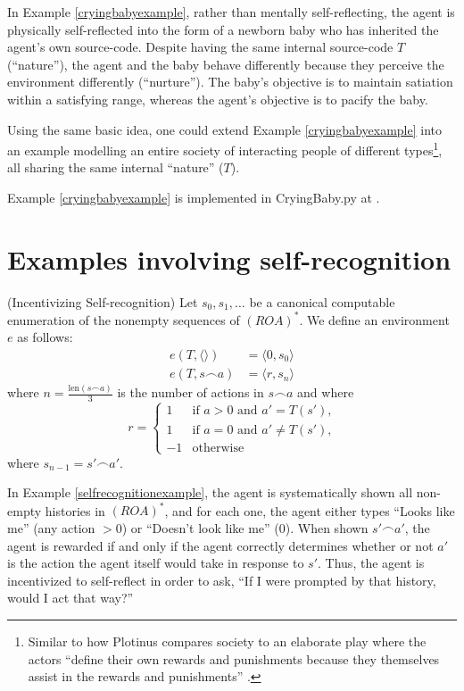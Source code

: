 \documentclass[runningheads]{llncs}
\begin{document}
In Example \ref{cryingbabyexample}, rather than mentally self-reflecting,
the agent is physically self-reflected into the form of a newborn baby
who has inherited the agent's own source-code. Despite having the same
internal source-code $T$ (``nature''), the agent and the baby behave
differently because they perceive the environment differently (``nurture'').
The baby's objective is to maintain satiation within a satisfying range,
whereas the agent's objective is to pacify the baby.

Using the same basic idea, one could extend Example \ref{cryingbabyexample}
into an example modelling an entire society of interacting people of different
types\footnote{Similar to how Plotinus compares society to an elaborate play
where the actors ``define their own rewards and punishments because
they themselves assist in the rewards and punishments'' \cite{plotinus}.},
all sharing the same internal ``nature'' ($T$).

Example \ref{cryingbabyexample} is implemented in CryingBaby.py at \cite{library}.

\section{Examples involving self-recognition}

\begin{example}
\label{selfrecognitionexample}
    (Incentivizing Self-recognition)
    Let $s_0,s_1,\ldots$ be a canonical computable enumeration of
    the nonempty sequences of $(ROA)^*$.
    We define an environment $e$ as follows:
    \begin{align*}
        e(T,\langle\rangle) &= \langle 0, s_0\rangle\\
        e(T,s\frown a) &= \langle r, s_n\rangle
    \end{align*}
    where $n=\frac{\mbox{len}(s\frown a)}{3}$ is the number
    of actions in $s\frown a$ and where
    \[
        r =
        \begin{cases}
            1 &\mbox{if $a>0$ and $a'=T(s')$,}\\
            1 &\mbox{if $a=0$ and $a'\not=T(s')$,}\\
            -1 &\mbox{otherwise}
        \end{cases}
    \]
    where $s_{n-1}=s'\frown a'$.
\end{example}

In Example \ref{selfrecognitionexample}, the agent is systematically
shown all non-empty histories in $(ROA)^*$, and for
each one, the agent either types ``Looks like me'' (any action $>0$)
or ``Doesn't look like me'' ($0$). When shown
$s'\frown a'$, the agent is rewarded if and only if the agent
correctly determines whether or not $a'$
is the action the agent itself would take in response to $s'$.
Thus, the agent is incentivized to self-reflect in order to ask, ``If I were prompted
by that history, would I act that way?''
\end{document}

